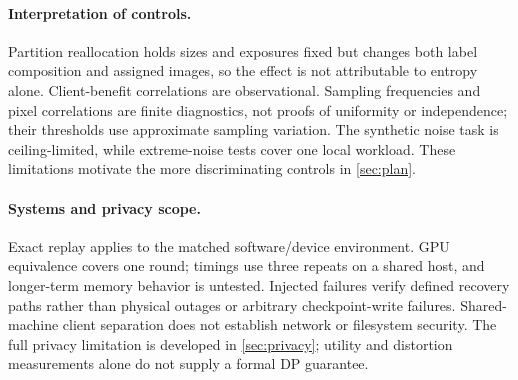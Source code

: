 \paragraph{Interpretation of controls.}
Partition reallocation holds sizes and exposures fixed but changes both label composition and assigned images, so the effect is not attributable to entropy alone. Client-benefit correlations are observational. Sampling frequencies and pixel correlations are finite diagnostics, not proofs of uniformity or independence; their thresholds use approximate sampling variation. The synthetic noise task is ceiling-limited, while extreme-noise tests cover one local workload. These limitations motivate the more discriminating controls in \cref{sec:plan}.

\begin{samepage}
\paragraph{Systems and privacy scope.}
Exact replay applies to the matched software/device environment. GPU equivalence covers one round; timings use three repeats on a shared host, and longer-term memory behavior is untested. Injected failures verify defined recovery paths rather than physical outages or arbitrary checkpoint-write failures. Shared-machine client separation does not establish network or filesystem security. The full privacy limitation is developed in \cref{sec:privacy}; utility and distortion measurements alone do not supply a formal DP guarantee.
\par
\end{samepage}

